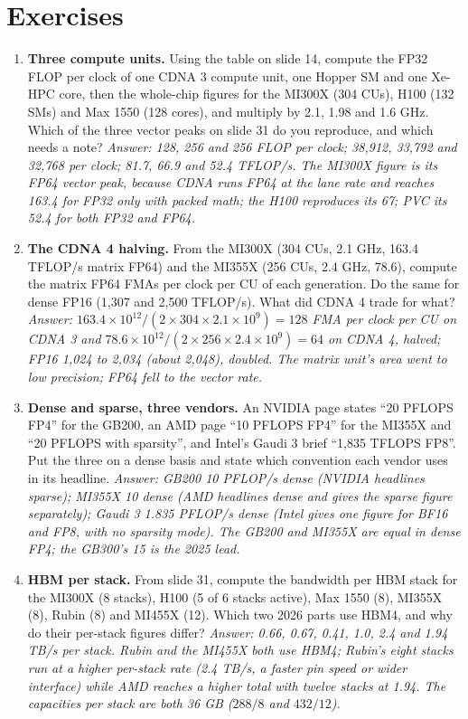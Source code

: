 \documentclass[11pt,letterpaper]{article}
\begin{document}
\clearpage
\section{Exercises}

\begin{enumerate}[leftmargin=1.6em,itemsep=6pt]
\item \textbf{Three compute units.} Using the table on slide 14, compute the FP32 FLOP per clock of one CDNA 3 compute unit, one Hopper SM and one Xe-HPC core, then the whole-chip figures for the MI300X (304 CUs), H100 (132 SMs) and Max 1550 (128 cores), and multiply by 2.1, 1.98 and 1.6 GHz. Which of the three vector peaks on slide 31 do you reproduce, and which needs a note? \emph{Answer: 128, 256 and 256 FLOP per clock; 38,912, 33,792 and 32,768 per clock; 81.7, 66.9 and 52.4 TFLOP/s. The MI300X figure is its FP64 vector peak, because CDNA runs FP64 at the lane rate and reaches 163.4 for FP32 only with packed math; the H100 reproduces its 67; PVC its 52.4 for both FP32 and FP64.}
\item \textbf{The CDNA 4 halving.} From the MI300X (304 CUs, 2.1 GHz, 163.4 TFLOP/s matrix FP64) and the MI355X (256 CUs, 2.4 GHz, 78.6), compute the matrix FP64 FMAs per clock per CU of each generation. Do the same for dense FP16 (1,307 and 2,500 TFLOP/s). What did CDNA 4 trade for what? \emph{Answer: $163.4\times 10^{12}/(2\times 304\times 2.1\times 10^9) = 128$ FMA per clock per CU on CDNA 3 and $78.6\times 10^{12}/(2\times 256\times 2.4\times 10^9) = 64$ on CDNA 4, halved; FP16 1,024 to 2,034 (about 2,048), doubled. The matrix unit's area went to low precision; FP64 fell to the vector rate.}
\item \textbf{Dense and sparse, three vendors.} An NVIDIA page states ``20 PFLOPS FP4'' for the GB200, an AMD page ``10 PFLOPS FP4'' for the MI355X and ``20 PFLOPS with sparsity'', and Intel's Gaudi 3 brief ``1,835 TFLOPS FP8''. Put the three on a dense basis and state which convention each vendor uses in its headline. \emph{Answer: GB200 10 PFLOP/s dense (NVIDIA headlines sparse); MI355X 10 dense (AMD headlines dense and gives the sparse figure separately); Gaudi 3 1.835 PFLOP/s dense (Intel gives one figure for BF16 and FP8, with no sparsity mode). The GB200 and MI355X are equal in dense FP4; the GB300's 15 is the 2025 lead.}
\item \textbf{HBM per stack.} From slide 31, compute the bandwidth per HBM stack for the MI300X (8 stacks), H100 (5 of 6 stacks active), Max 1550 (8), MI355X (8), Rubin (8) and MI455X (12). Which two 2026 parts use HBM4, and why do their per-stack figures differ? \emph{Answer: 0.66, 0.67, 0.41, 1.0, 2.4 and 1.94 TB/s per stack. Rubin and the MI455X both use HBM4; Rubin's eight stacks run at a higher per-stack rate (2.4 TB/s, a faster pin speed or wider interface) while AMD reaches a higher total with twelve stacks at 1.94. The capacities per stack are both 36 GB ($288/8$ and $432/12$).}

\end{enumerate}
\end{document}

